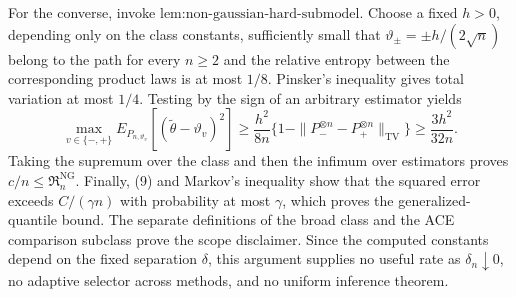 For the converse, invoke \(\text{lem:non-gaussian-hard-submodel}\).  Choose a fixed \(h>0\), depending only on the class constants, sufficiently small that \(\vartheta_{\pm}=\pm h/(2\sqrt n)\) belong to the path for every \(n\ge2\) and the relative entropy between the corresponding product laws is at most \(1/8\).  Pinsker's inequality gives total variation at most \(1/4\).  Testing by the sign of an arbitrary estimator yields
\[
 \max_{v\in\{-,+\}}E_{P_{n,\vartheta_v}}
 [ (\widetilde\theta-\vartheta_v)^2]
 \ge\frac{h^2}{8n}
 \{1-\|P_-^{\otimes n}-P_+^{\otimes n}\|_{\mathrm{TV}}\}
 \ge\frac{3h^2}{32n}.
\]
Taking the supremum over the class and then the infimum over estimators proves \(c/n\le\mathfrak R_n^{\mathrm{NG}}\).  Finally, (9) and Markov's inequality show that the squared error exceeds \(C/(\gamma n)\) with probability at most \(\gamma\), which proves the generalized-quantile bound.  The separate definitions of the broad class and the ACE comparison subclass prove the scope disclaimer.  Since the computed constants depend on the fixed separation \(\delta\), this argument supplies no useful rate as \(\delta_n\downarrow0\), no adaptive selector across methods, and no uniform inference theorem.